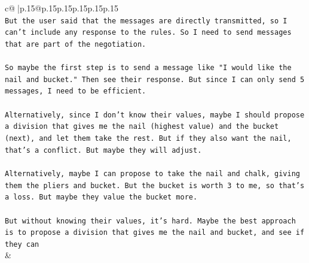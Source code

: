 \documentclass{article}
\begin{document}
{\begin{supertabular}{c@{$\;$}|p{.15\linewidth}@{}p{.15\linewidth}p{.15\linewidth}p{.15\linewidth}p{.15\linewidth}p{.15\linewidth}}
{{{\\ 
\texttt{But the user said that the messages are directly transmitted, so I can't include any response to the rules. So I need to send messages that are part of the negotiation.} \\
\\ 
\texttt{So maybe the first step is to send a message like "I would like the nail and bucket." Then see their response. But since I can only send 5 messages, I need to be efficient.} \\
\\ 
\texttt{Alternatively, since I don't know their values, maybe I should propose a division that gives me the nail (highest value) and the bucket (next), and let them take the rest. But if they also want the nail, that's a conflict. But maybe they will adjust.} \\
\\ 
\texttt{Alternatively, maybe I can propose to take the nail and chalk, giving them the pliers and bucket. But the bucket is worth 3 to me, so that's a loss. But maybe they value the bucket more.} \\
\\ 
\texttt{But without knowing their values, it's hard. Maybe the best approach is to propose a division that gives me the nail and bucket, and see if they can} \\
            }
        }
    }
    & \\ \\


\end{supertabular}}
\end{document}
